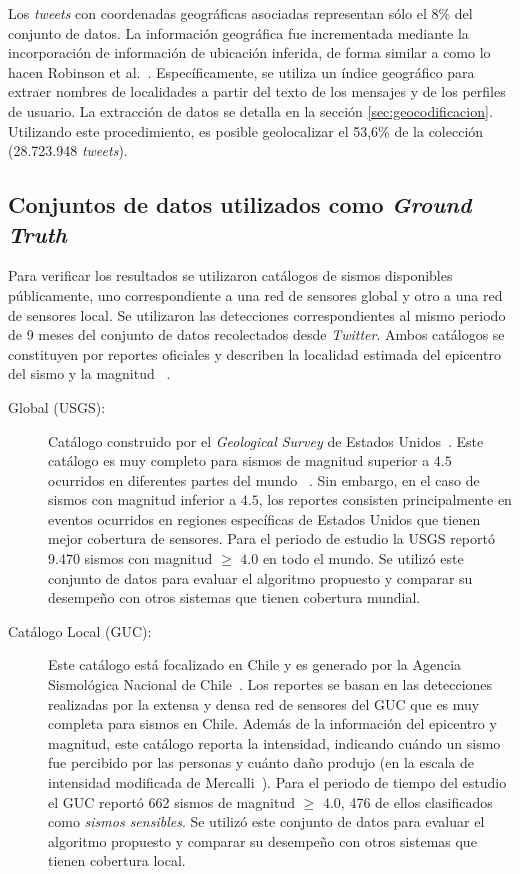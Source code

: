 		Los \textit{tweets} con coordenadas geográficas asociadas representan sólo el 8\% del conjunto de datos. La información geográfica fue incrementada mediante la incorporación de información de ubicación inferida, de forma similar a como lo hacen Robinson et al.~\cite{robinson2013sensitive}. Específicamente, se utiliza un índice geográfico para extraer nombres de localidades a partir del texto de los mensajes y de los perfiles de usuario. La extracción de datos se detalla en la sección \ref{sec:geocodificacion}. Utilizando este procedimiento, es posible geolocalizar el 53,6\% de la colección (28.723.948 \textit{tweets}).
		
	\subsection{Conjuntos de datos utilizados como \textit{Ground Truth}}
	
		Para verificar los resultados se utilizaron catálogos de sismos disponibles públicamente, uno correspondiente a una red de sensores global y otro a una red de sensores local. Se utilizaron las detecciones correspondientes al mismo periodo de 9 meses del conjunto de datos recolectados desde \textit{Twitter}. Ambos catálogos se constituyen por reportes oficiales y describen la localidad estimada del epicentro del sismo y la magnitud ~\cite{usgs:magnitude}.
		
\begin{description}
\item[Global (USGS):] 
		Catálogo construido por el \textit{Geological Survey} de Estados Unidos~\cite{usgs:data}. Este catálogo es muy completo para sismos de magnitud superior a $4.5$ ocurridos en diferentes partes del mundo ~\cite{earle2010omg}. Sin embargo, en el caso de sismos con magnitud inferior a $4.5$, los reportes consisten principalmente en eventos ocurridos en regiones específicas de Estados Unidos que tienen mejor cobertura de sensores. Para el periodo de estudio la USGS reportó 9.470 sismos con magnitud $\geq$ $4.0$ en todo el mundo. Se utilizó este conjunto de datos para evaluar el algoritmo propuesto y comparar su desempeño con otros sistemas que tienen cobertura mundial.

\item[Catálogo Local (GUC):]
		Este catálogo está focalizado en Chile y es generado por la Agencia Sismológica Nacional de Chile~\cite{guc:data}. Los reportes se basan en las detecciones realizadas por la extensa y densa red de sensores del GUC que es muy completa para sismos en Chile. Además de la información del epicentro y magnitud, este catálogo reporta la intensidad, indicando cuándo un sismo fue percibido por las personas y cuánto daño produjo (en la escala de intensidad modificada de Mercalli~\cite{usgs:mercalli}).
		Para el periodo de tiempo del estudio el GUC reportó 662 sismos de magnitud $\geq$ $4.0$, 476 de ellos clasificados como \textit{sismos sensibles}. Se utilizó este conjunto de datos para evaluar el algoritmo propuesto y comparar su desempeño con otros sistemas que tienen cobertura local. 
		
\end{description}
		
